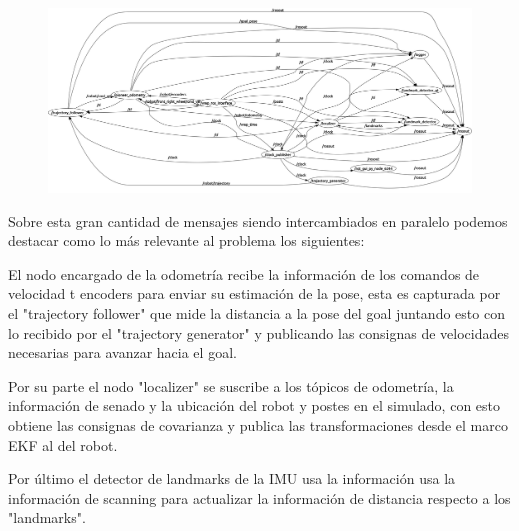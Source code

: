 \begin{figure}[!htb]
\begin{center}
\includegraphics[width=\linewidth]{rqtgraphekf.png} 
\end{center}
\end{figure}

Sobre esta gran cantidad de mensajes siendo intercambiados en paralelo podemos destacar como lo más relevante al problema los siguientes:

El nodo encargado de la odometría recibe la información de los comandos de velocidad t encoders para enviar su estimación de la pose, esta es capturada por el "trajectory follower" que mide la distancia a la pose del goal juntando esto con lo recibido por el "trajectory generator" y publicando las consignas de velocidades necesarias para avanzar hacia el goal.

Por su parte el nodo "localizer" se suscribe a los tópicos de odometría, la información de senado y la ubicación del robot y postes en el simulado, con esto obtiene las consignas de covarianza y publica las transformaciones desde el marco EKF al del robot.

Por último el detector de landmarks de la IMU usa la información usa la información de scanning para actualizar la información de distancia respecto a los "landmarks".


